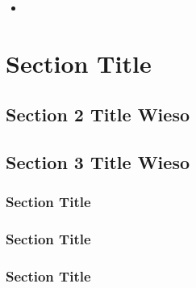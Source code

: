 \documentclass[letterpaper,10pt,english]{sphinxmanual}
\begin{document}
\begin{sphinxShadowBox}
\begin{itemize}
\begin{itemize}
\begin{itemize}
\begin{itemize}
\begin{itemize}
\item {} 
\sphinxAtStartPar
{}\label{\detokenize{install:id18}}{\hyperref[\detokenize{install:id7}]{}}

\end{itemize}

\end{itemize}

\end{itemize}

\end{itemize}

\end{itemize}
\end{sphinxShadowBox}


\section{Section Title}
\label{\detokenize{install:section-title}}

\subsection{}
\label{\detokenize{install:section-title-wieso}}

\subsection{\sphinxhyphen{}Section 2 Title Wieso\sphinxhyphen{}}
\label{\detokenize{install:section-2-title-wieso}}

\subsection{Section 3 Title Wieso}
\label{\detokenize{install:section-3-title-wieso}}

\subsubsection{Section Title}
\label{\detokenize{install:id2}}

\subsubsection{Section Title}
\label{\detokenize{install:id3}}

\subsubsection{Section Title}
\label{\detokenize{install:id4}}
\end{document}
